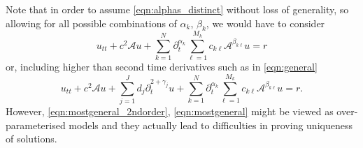 Note that in order to assume \eqref{eqn:alphas_distinct} without loss of generality, so allowing for all possible combinations of $\alpha_k$, $\beta_k$, we would have to consider
\begin{equation}\label{eqn:mostgeneral_2ndorder}
u_{tt}+c^2\mathcal{A}u+\sum_{k=1}^N\partial_t^{\alpha_k}\sum_{\ell=1}^{M_k} c_{k\ell}\mathcal{A}^{\beta_{k\ell}} u=r
\end{equation}
or, including higher than second time derivatives such as in \eqref{eqn:general}
\begin{equation}\label{eqn:mostgeneral}
u_{tt}+c^2\mathcal{A}u+\sum_{j=1}^J d_j\partial_t^{2+\gamma_j}u+\sum_{k=1}^N\partial_t^{\alpha_k}\sum_{\ell=1}^{M_k} c_{k\ell}\mathcal{A}^{\beta_{k\ell}}u=r.
\end{equation}
However, \eqref{eqn:mostgeneral_2ndorder}, \eqref{eqn:mostgeneral} might be
viewed as over-parameterised models and they actually lead to difficulties
in proving uniqueness of solutions.


\medskip

